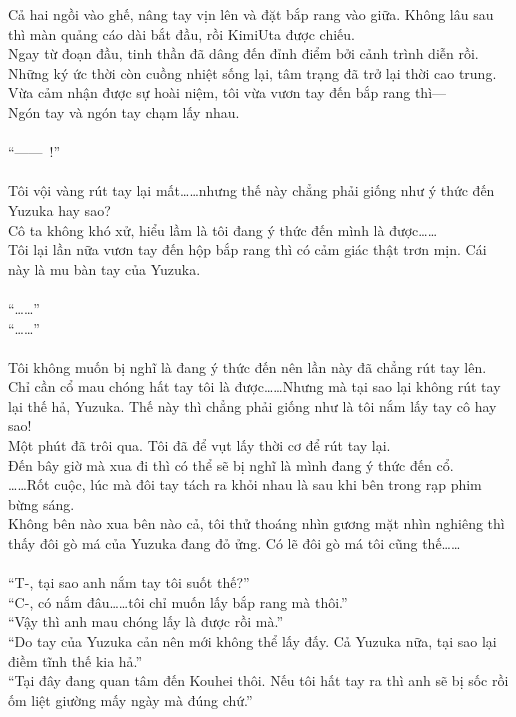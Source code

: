 \documentclass[12pt,a4paper, twosides]{book}
\begin{document}
Cả hai ngồi vào ghế, nâng tay vịn lên và đặt bắp rang vào giữa. Không lâu sau thì màn quảng cáo dài bắt đầu, rồi KimiUta được chiếu.\\
Ngay từ đoạn đầu, tinh thần đã dâng đến đỉnh điểm bởi cảnh trình diễn rồi. Những ký ức thời còn cuồng nhiệt sống lại, tâm trạng đã trở lại thời cao trung. Vừa cảm nhận được sự hoài niệm, tôi vừa vươn tay đến bắp rang thì—\\
Ngón tay và ngón tay chạm lấy nhau.\\
\\
“——~!”\\
\\
Tôi vội vàng rút tay lại mất……nhưng thế này chẳng phải giống như ý thức đến Yuzuka hay sao?\\
Cô ta không khó xử, hiểu lầm là tôi đang ý thức đến mình là được……\\
Tôi lại lần nữa vươn tay đến hộp bắp rang thì có cảm giác thật trơn mịn. Cái này là mu bàn tay của Yuzuka.\\
\\
“……”\\
“……”\\
\\
Tôi không muốn bị nghĩ là đang ý thức đến nên lần này đã chẳng rút tay lên. Chỉ cần cổ mau chóng hất tay tôi là được……Nhưng mà tại sao lại không rút tay lại thế hả, Yuzuka. Thế này thì chẳng phải giống như là tôi nắm lấy tay cô hay sao!\\
Một phút đã trôi qua. Tôi đã để vụt lấy thời cơ để rút tay lại.\\
Đến bây giờ mà xua đi thì có thể sẽ bị nghĩ là mình đang ý thức đến cổ.\\
……Rốt cuộc, lúc mà đôi tay tách ra khỏi nhau là sau khi bên trong rạp phim bừng sáng.\\
Không bên nào xua bên nào cả, tôi thử thoáng nhìn gương mặt nhìn nghiêng thì thấy đôi gò má của Yuzuka đang đỏ ửng. Có lẽ đôi gò má tôi cũng thế……\\
\\
“T-, tại sao anh nắm tay tôi suốt thế?”\\
“C-, có nắm đâu……tôi chỉ muốn lấy bắp rang mà thôi.”\\
“Vậy thì anh mau chóng lấy là được rồi mà.”\\
“Do tay của Yuzuka cản nên mới không thể lấy đấy. Cả Yuzuka nữa, tại sao lại điềm tĩnh thế kia hả.”\\
“Tại đây đang quan tâm đến Kouhei thôi. Nếu tôi hất tay ra thì anh sẽ bị sốc rồi ốm liệt giường mấy ngày mà đúng chứ.”\\
\end{document}
